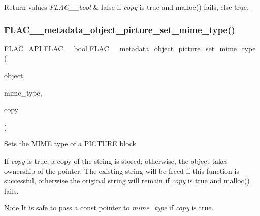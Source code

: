 \begin{DoxyRetVals}{Return values}
{\em F\+L\+A\+C\+\_\+\+\_\+bool} & {\ttfamily false} if {\itshape copy} is {\ttfamily true} and malloc() fails, else {\ttfamily true}. \\
\hline
\end{DoxyRetVals}
\mbox{\label{group__flac__metadata__object_ga5db3363648b6e7693e032f200f241e85}} 
\subsubsection{\texorpdfstring{FLAC\_\_metadata\_object\_picture\_set\_mime\_type()}{FLAC\_\_metadata\_object\_picture\_set\_mime\_type()}}
{\footnotesize\ttfamily \mbox{\hyperlink{group__flac__export_ga56ca07df8a23310707732b1c0007d6f5}{F\+L\+A\+C\+\_\+\+A\+PI}} \mbox{\hyperlink{ordinals_8h_a95103469f1cbd78b8cf250194985b34e}{F\+L\+A\+C\+\_\+\+\_\+bool}} F\+L\+A\+C\+\_\+\+\_\+metadata\+\_\+object\+\_\+picture\+\_\+set\+\_\+mime\+\_\+type (\begin{DoxyParamCaption}\item[{\mbox{\hyperlink{struct_f_l_a_c_____stream_metadata}{F\+L\+A\+C\+\_\+\+\_\+\+Stream\+Metadata}} $\ast$}]{object,  }\item[{char $\ast$}]{mime\+\_\+type,  }\item[{\mbox{\hyperlink{ordinals_8h_a95103469f1cbd78b8cf250194985b34e}{F\+L\+A\+C\+\_\+\+\_\+bool}}}]{copy }\end{DoxyParamCaption})}

Sets the M\+I\+ME type of a P\+I\+C\+T\+U\+RE block.

If {\itshape copy} is {\ttfamily true}, a copy of the string is stored; otherwise, the object takes ownership of the pointer. The existing string will be freed if this function is successful, otherwise the original string will remain if {\itshape copy} is {\ttfamily true} and malloc() fails.

\begin{DoxyNote}{Note}
It is safe to pass a const pointer to {\itshape mime\+\_\+type} if {\itshape copy} is {\ttfamily true}.
\end{DoxyNote}

